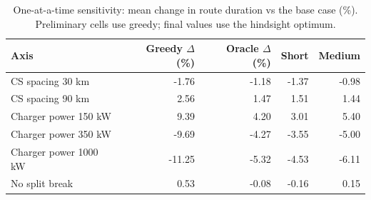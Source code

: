 \begin{table}[ht]\centering
\caption{One-at-a-time sensitivity: mean change in route duration vs the base case (\%). Preliminary cells use greedy; final values use the hindsight optimum.}
\label{tab:sensitivity}
\begin{tabular}{lrrrr}
\hline
Axis & Greedy $\Delta$ (\%) & Oracle $\Delta$ (\%) & Short & Medium \\
\hline
CS spacing 30 km & -1.76 & -1.18 & -1.37 & -0.98 \\
CS spacing 90 km & 2.56 & 1.47 & 1.51 & 1.44 \\
Charger power 150 kW & 9.39 & 4.20 & 3.01 & 5.40 \\
Charger power 350 kW & -9.69 & -4.27 & -3.55 & -5.00 \\
Charger power 1000 kW & -11.25 & -5.32 & -4.53 & -6.11 \\
No split break & 0.53 & -0.08 & -0.16 & 0.15 \\
\hline
\end{tabular}
\end{table}
